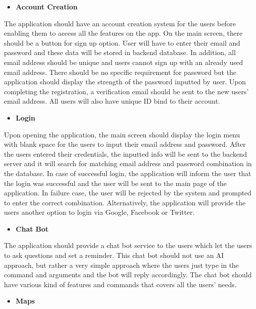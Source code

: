 \documentclass[conference]{IEEEtran}
\begin{document}
\begin{itemize}
\item \textbf{Account Creation}
\end{itemize}
\par The application should have an account creation system for the users before enabling them to access all the features on the app. On the main screen, there should be a button for sign up option. User will have to enter their email and password and these data will be stored in backend database. In addition, all email address should be unique and users cannot sign up with an already used email address. There should be no specific requirement for password but the application should display the strength of the password inputted by user. Upon completing the registration, a verification email should be sent to the new users’ email address. All users will also have unique ID bind to their account.\\
\begin{itemize}
\item \textbf{Login}
\end{itemize}
\par Upon opening the application, the main screen should display the login menu with blank space for the users to input their email address and password. After the users entered their credentials, the inputted info will be sent to the backend server and it will search for matching email address and password combination in the database. In case of successful login, the application will inform the user that the login was successful and the user will be sent to the main page of the application. In failure case, the user will be rejected by the system and prompted to enter the correct combination.  Alternatively, the application will provide the users another option to login via Google, Facebook or Twitter.\\
\begin{itemize}
\item \textbf{Chat Bot}
\end{itemize}
\par The application should provide a chat bot service to the users which let the users to ask questions and set a reminder. This chat bot should not use an AI approach, but rather a very simple approach where the users just type in the command and arguments and the bot will reply accordingly. The chat bot should have various kind of features and commands that covers all the users’ needs.\\
\begin{itemize}
\item \textbf{Maps}
\end{itemize}
\end{document}
